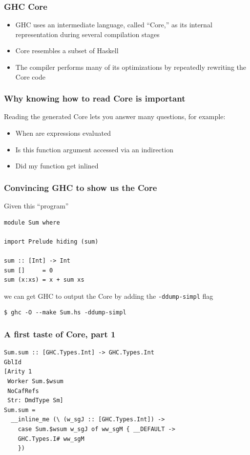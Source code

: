 \documentclass{beamer}
\begin{document}

\begin{frame}
  \frametitle{GHC Core}

  \begin{itemize}
  \item GHC uses an intermediate language, called ``Core,'' as its
    internal representation during several compilation stages
  \item Core resembles a subset of Haskell
  \item The compiler performs many of its optimizations by repeatedly
    rewriting the Core code
  \end{itemize}
\end{frame}

\begin{frame}
  \frametitle{Why knowing how to read Core is important}

  Reading the generated Core lets you answer many questions, for
  example:
  \begin{itemize}
  \item When are expressions evaluated
  \item Is this function argument accessed via an indirection
  \item Did my function get inlined
  \end{itemize}
\end{frame}

\begin{frame}[fragile]
  \frametitle{Convincing GHC to show us the Core}

  Given this ``program''

  \begin{lstlisting}
module Sum where

import Prelude hiding (sum)

sum :: [Int] -> Int
sum []     = 0
sum (x:xs) = x + sum xs
  \end{lstlisting}

  we can get GHC to output the Core by adding the
  \texttt{-ddump-simpl} flag
  \begin{verbatim}
$ ghc -O --make Sum.hs -ddump-simpl
  \end{verbatim}
\end{frame}

\begin{frame}[fragile]
  \frametitle{A first taste of Core, part 1}
  \begin{verbatim}
Sum.sum :: [GHC.Types.Int] -> GHC.Types.Int
GblId
[Arity 1
 Worker Sum.$wsum
 NoCafRefs
 Str: DmdType Sm]
Sum.sum =
  __inline_me (\ (w_sgJ :: [GHC.Types.Int]) ->
    case Sum.$wsum w_sgJ of ww_sgM { __DEFAULT ->
    GHC.Types.I# ww_sgM
    })
  \end{verbatim}
\end{frame}
\end{document}
